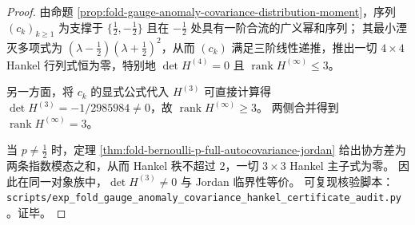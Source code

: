 \begin{proof}
由命题 \ref{prop:fold-gauge-anomaly-covariance-distribution-moment}，序列 \((c_k)_{k\ge 1}\) 为支撑于 \(\{\tfrac12,-\tfrac12\}\) 且在 \(-\tfrac12\) 处具有一阶合流的广义幂和序列；
其最小湮灭多项式为 \((\lambda-\tfrac12)(\lambda+\tfrac12)^2\)，从而 \((c_k)\) 满足三阶线性递推，推出一切 \(4\times 4\) Hankel 行列式恒为零，特别地 \(\det H^{(4)}=0\) 且 \(\operatorname{rank}H^{(\infty)}\le 3\)。
\par
另一方面，将 \(c_k\) 的显式公式代入 \(H^{(3)}\) 可直接计算得 \(\det H^{(3)}=-1/2985984\neq 0\)，故 \(\operatorname{rank}H^{(\infty)}\ge 3\)。
两侧合并得到 \(\operatorname{rank}H^{(\infty)}=3\)。
\par
当 \(p\neq\tfrac12\) 时，定理 \ref{thm:fold-bernoulli-p-full-autocovariance-jordan} 给出协方差为两条指数模态之和，从而 Hankel 秩不超过 \(2\)，一切 \(3\times 3\) Hankel 主子式为零。
因此在同一对象族中，\(\det H^{(3)}\neq 0\) 与 Jordan 临界性等价。
可复现核验脚本：\texttt{scripts/exp\_fold\_gauge\_anomaly\_covariance\_hankel\_certificate\_audit.py}。证毕。
\end{proof}

\endinput

